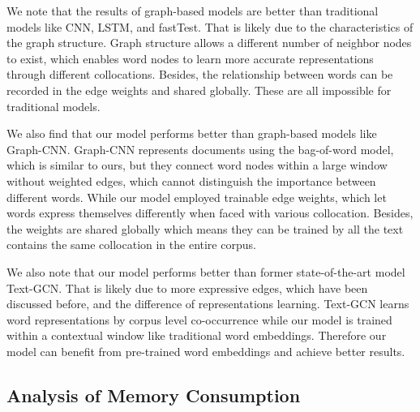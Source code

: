 \documentclass[11pt,a4paper]{article}
\begin{document}
We note that the results of graph-based models are better than traditional models like CNN, LSTM, and fastTest. That is likely due to the characteristics of the graph structure. Graph structure allows a different number of neighbor nodes to exist, which enables word nodes to learn more accurate representations through different collocations. Besides, the relationship between words can be recorded in the edge weights and shared globally. These are all impossible for traditional models. 

We also find that our model performs better than graph-based models like Graph-CNN. Graph-CNN represents documents using the bag-of-word model, which is similar to ours, but they connect word nodes within a large window without weighted edges, which cannot distinguish the importance between different words. While our model employed trainable edge weights, which let words express themselves differently when faced with various collocation. Besides, the weights are shared globally which means they can be trained by all the text contains the same collocation in the entire corpus. 

We also note that our model performs better than former state-of-the-art model Text-GCN.
That is likely due to more expressive edges, which have been discussed before, and the difference of representations learning. Text-GCN learns word representations by corpus level co-occurrence while our model is trained within a contextual window like traditional word embeddings. 
Therefore our model can benefit from pre-trained word embeddings and achieve better results.



\subsection{Analysis of Memory Consumption}

\begin{table}[t]
\centering
\footnotesize
{}
\caption{\label{mem-table} Comparison of memory consuming. The number of edges in the whole model is in parentheses.}
\end{table}
\end{document}

